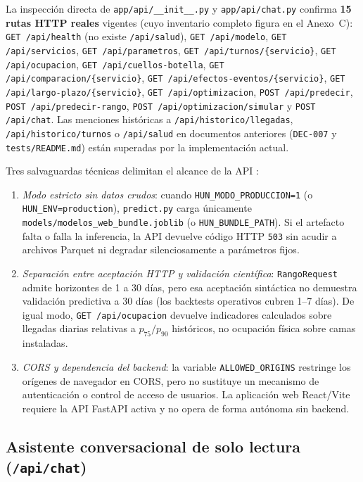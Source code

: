 La inspección directa de \texttt{app/api/\_\_init\_\_.py} y \texttt{app/api/chat.py} confirma \textbf{15 rutas HTTP reales} vigentes (cuyo inventario completo figura en el Anexo~C): \texttt{GET /api/health} (no existe \texttt{/api/salud}), \texttt{GET /api/modelo}, \texttt{GET /api/servicios}, \texttt{GET /api/parametros}, \texttt{GET /api/turnos/\{servicio\}}, \texttt{GET /api/ocupacion}, \texttt{GET /api/cuellos-botella}, \texttt{GET /api/comparacion/\{servicio\}}, \texttt{GET /api/efectos-eventos/\{servicio\}}, \texttt{GET /api/largo-plazo/\{servicio\}}, \texttt{GET /api/optimizacion}, \texttt{POST /api/predecir}, \texttt{POST /api/predecir-rango}, \texttt{POST /api/optimizacion/simular} y \texttt{POST /api/chat}. Las menciones históricas a \texttt{/api/historico/llegadas}, \texttt{/api/historico/turnos} o \texttt{/api/salud} en documentos anteriores (\texttt{DEC-007} y \texttt{tests/README.md}) están superadas por la implementación actual.

Tres salvaguardas técnicas delimitan el alcance de la API \parencite{mediflow2026auditoria}:
\begin{enumerate}[leftmargin=*,nosep]
\item \textit{Modo estricto sin datos crudos}: cuando \texttt{HUN\_MODO\_PRODUCCION=1} (o \texttt{HUN\_ENV=production}), \texttt{predict.py} carga únicamente \texttt{models/modelos\_web\_bundle.joblib} (o \texttt{HUN\_BUNDLE\_PATH}). Si el artefacto falta o falla la inferencia, la API devuelve código HTTP \texttt{503} sin acudir a archivos Parquet ni degradar silenciosamente a parámetros fijos.
\item \textit{Separación entre aceptación HTTP y validación científica}: \texttt{RangoRequest} admite horizontes de 1 a 30 días, pero esa aceptación sintáctica no demuestra validación predictiva a 30 días (los backtests operativos cubren 1--7 días). De igual modo, \texttt{GET /api/ocupacion} devuelve indicadores calculados sobre llegadas diarias relativas a $p_{75}/p_{90}$ históricos, no ocupación física sobre camas instaladas.
\item \textit{CORS y dependencia del backend}: la variable \texttt{ALLOWED\_ORIGINS} restringe los orígenes de navegador en CORS, pero no sustituye un mecanismo de autenticación o control de acceso de usuarios. La aplicación web React/Vite requiere la API FastAPI activa y no opera de forma autónoma sin backend.
\end{enumerate}

\subsection{Asistente conversacional de solo lectura (\texttt{/api/chat})}

